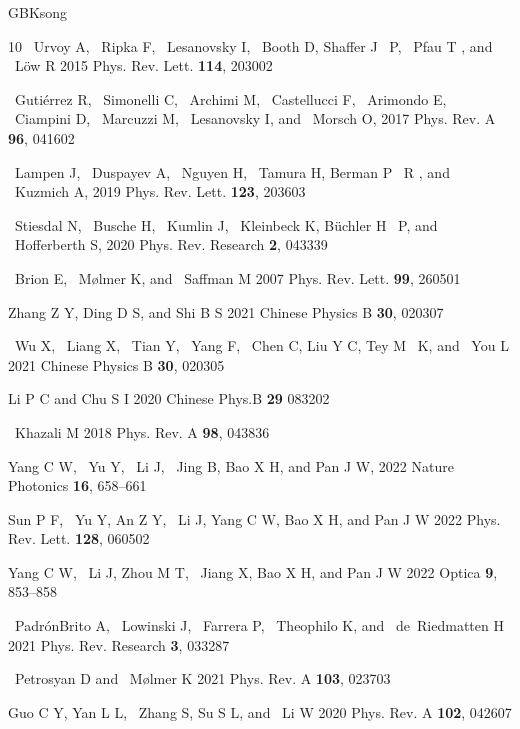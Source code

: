 \documentclass{cpbtex}
\begin{document}
\begin{CJK*}{GBK}{song}
\begin{thebibliography}{10}
~Urvoy A, ~Ripka F, ~Lesanovsky I, ~Booth D, Shaffer J ~P, ~Pfau T , and
~L\"ow R 2015 {{Phys. Rev. Lett.}} \textbf{114}, 203002
 

~Guti\'errez R, ~Simonelli C, ~Archimi M, ~Castellucci F, ~Arimondo E,
  ~Ciampini D, ~Marcuzzi M, ~Lesanovsky I, and ~Morsch O, 2017 {{Phys. Rev. A}} \textbf{96}, 041602

~Lampen J, ~Duspayev A, ~Nguyen H, ~Tamura H, Berman P ~R , and ~Kuzmich A,
  2019 {{Phys. Rev. Lett.}} \textbf{123}, 203603

~Stiesdal N, ~Busche H, ~Kumlin J, ~Kleinbeck K, B\"uchler H ~P, and
  ~Hofferberth S, 2020 {{Phys. Rev. Research}} \textbf{2}, 043339

~Brion E, ~M\o{}lmer K, and ~Saffman M 2007 {{Phys. Rev. Lett.}} \textbf{99}, 260501 

Zhang Z Y, Ding D S, and Shi  B S 2021 {{Chinese Physics B}} \textbf{30}, 020307

~Wu X, ~Liang X, ~Tian Y, ~Yang F, ~Chen C, Liu Y C, Tey M ~K, and ~You L 
  2021 {{Chinese Physics B}} \textbf{30}, 020305

Li P C  and Chu S I 2020 {{Chinese Phys.B}} \textbf{29} 083202 

~Khazali M 2018 {{Phys. Rev. A}} \textbf{98}, 043836 

Yang C W, ~Yu Y, ~Li J, ~Jing B, Bao X H, and Pan J W,
  2022 {{Nature Photonics}} \textbf{16}, 658--661

Sun P F, ~Yu Y, An Z Y, ~Li J, Yang C W, Bao  X H, and Pan  J W 2022 {{Phys. Rev. Lett.}} \textbf{128}, 060502

Yang C W, ~Li J, Zhou M T, ~Jiang X, Bao X H, and Pan J W
   2022 {{Optica}} \textbf{9}, 853--858 

~Padr\'onBrito A, ~Lowinski J, ~Farrera P, ~Theophilo K, and ~de~Riedmatten H 2021 {{Phys. Rev. Research}} \textbf{3}, 033287

~Petrosyan D and ~M\o{}lmer K 2021 {{Phys. Rev. A}} \textbf{103}, 023703 

Guo C Y, Yan L L, ~Zhang S, Su S L, and ~Li W 2020 {{Phys. Rev. A}} \textbf{102}, 042607 


\end{thebibliography}
\end{CJK*}
\end{document}
